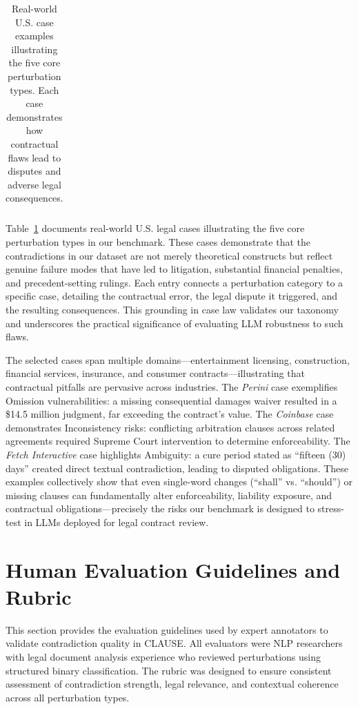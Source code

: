 \documentclass[11pt]{article}
\newcommand{\datasetName}{{\sc CLAUSE}\xspace}
\begin{document}
\begin{table}[h!]
\begin{tabular}{|>{\centering\arraybackslash}m{1.8cm}|>{\centering\arraybackslash}m{3.8cm}|>{\centering\arraybackslash}m{2.8cm}|>{\centering\arraybackslash}m{3.5cm}|>{\centering\arraybackslash}m{3cm}|}
\hline
\end{tabular}
\caption{Real-world U.S. case examples illustrating the five core perturbation types. Each case demonstrates how contractual flaws lead to disputes and adverse legal consequences.}
\label{tab:contractual_pitfalls}
\end{table}

Table~\ref{tab:contractual_pitfalls} documents real-world U.S. legal cases illustrating the five core perturbation types in our benchmark. These cases demonstrate that the contradictions in our dataset are not merely theoretical constructs but reflect genuine failure modes that have led to litigation, substantial financial penalties, and precedent-setting rulings. Each entry connects a perturbation category to a specific case, detailing the contractual error, the legal dispute it triggered, and the resulting consequences. This grounding in case law validates our taxonomy and underscores the practical significance of evaluating LLM robustness to such flaws.

The selected cases span multiple domains—entertainment licensing, construction, financial services, insurance, and consumer contracts—illustrating that contractual pitfalls are pervasive across industries. The \textit{Perini} case exemplifies Omission vulnerabilities: a missing consequential damages waiver resulted in a \$14.5 million judgment, far exceeding the contract's value. The \textit{Coinbase} case demonstrates Inconsistency risks: conflicting arbitration clauses across related agreements required Supreme Court intervention to determine enforceability. The \textit{Fetch Interactive} case highlights Ambiguity: a cure period stated as ``fifteen (30) days'' created direct textual contradiction, leading to disputed obligations. These examples collectively show that even single-word changes (``shall'' vs. ``should'') or missing clauses can fundamentally alter enforceability, liability exposure, and contractual obligations—precisely the risks our benchmark is designed to stress-test in LLMs deployed for legal contract review.





\clearpage

\section{Human Evaluation Guidelines and Rubric}
\label{sec:human-evaluation-rubric}

This section provides the evaluation guidelines used by expert annotators to validate contradiction quality in \datasetName. All evaluators were NLP researchers with legal document analysis experience who reviewed perturbations using structured binary classification. The rubric was designed to ensure consistent assessment of contradiction strength, legal relevance, and contextual coherence across all perturbation types.
\end{document}
